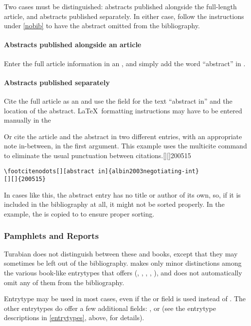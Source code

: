 \documentclass{ltxdockit}[2010/02/12]
\begin{document}
Two cases must be distinguished: abstracts published alongside the full-length article, and abstracts published separately. In either case, follow the instructions under \ref{nobib} to have the abstract omitted from the bibliography.

\paragraph{Abstracts published alongside an article}
 Enter the full article information in an , and simply add the word ``abstract'' in .

\paragraph{Abstracts published separately}
 Cite the full article as an  and use the  field for the text ``abstract in'' and the location of the abstract. \LaTeX \ formatting instructions may have to be entered manually in the 

Or cite the article and the abstract in two different entries, with an appropriate note in-between, in the first  argument. This example uses the multicite command  to eliminate the usual punctuation between citations.[][]{200515}
\begin{verbatim}
\footcitenodots[][abstract in]{albin2003negotiating-int}
[][]{200515}
\end{verbatim} 
In cases like this, the abstract entry has no title or author of its own, so, if it is included in the bibliography at all, it might not be sorted properly. In the example, the  is copied to  to ensure proper sorting.

\subsubsection{Pamphlets and Reports}
Turabian does not distinguish between these and books, except that they may sometimes be left out of the bibliography.  makes only minor distinctions among the various book-like entrytypes that  offers (, , , , ), and does not automatically omit any of them from the bibliography. 

Entrytype  may be used in most cases, even if the  or  field is used instead of . The other entrytypes do offer a few additional fields: ,  or  (see the entrytype descriptions in \ref{entrytypes}, above, for details).
\end{document}
